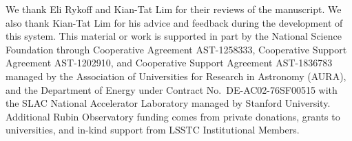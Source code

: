 \documentclass[]{spie}
\begin{document}
\acknowledgments

We thank Eli Rykoff and Kian-Tat Lim for their reviews of the manuscript.
We also thank Kian-Tat Lim for his advice and feedback during the development of this system.
This material or work is supported in part by the National Science Foundation through Cooperative Agreement AST-1258333, Cooperative Support Agreement AST-1202910, and Cooperative Support Agreement AST-1836783 managed by the Association of Universities for Research in Astronomy (AURA), and the Department of Energy under Contract No.\ DE-AC02-76SF00515 with the SLAC National Accelerator Laboratory managed by Stanford University.
Additional Rubin Observatory funding comes from private donations, grants to universities, and in-kind support from LSSTC Institutional Members.



\end{document}
